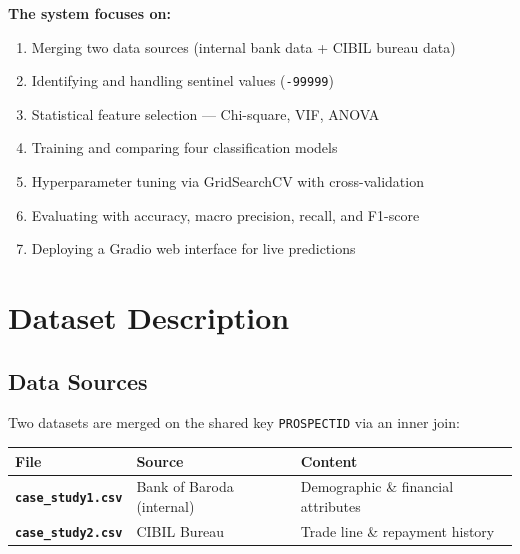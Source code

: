 \documentclass[12pt,a4paper]{article}
\begin{document}
\vspace{0.5em}

\textbf{The system focuses on:}

\begin{enumerate}
  \item Merging two data sources (internal bank data + CIBIL bureau data)
  \item Identifying and handling sentinel values (\texttt{-99999})
  \item Statistical feature selection --- Chi-square, VIF, ANOVA
  \item Training and comparing four classification models
  \item Hyperparameter tuning via GridSearchCV with cross-validation
  \item Evaluating with accuracy, macro precision, recall, and F1-score
  \item Deploying a Gradio web interface for live predictions
\end{enumerate}

\newpage

\section{Dataset Description}

\subsection{Data Sources}

Two datasets are merged on the shared key \texttt{PROSPECTID} via an inner join:

\vspace{0.4em}
\begin{center}
\begin{tabular}{>{\bfseries}p{4cm} p{4.5cm} p{6cm}}
  \toprule
  \textbf{File} & \textbf{Source} & \textbf{Content} \\
  \midrule
  \texttt{case\_study1.csv} & Bank of Baroda (internal) & Demographic \& financial attributes \\
  \texttt{case\_study2.csv} & CIBIL Bureau               & Trade line \& repayment history \\
  \bottomrule
\end{tabular}
\end{center}
\end{document}
